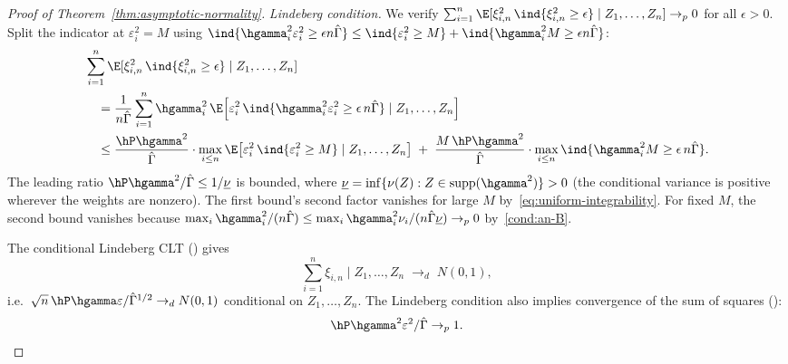 \documentclass{article}
\begin{document}
\begin{proof}[Proof of Theorem~\ref{thm:asymptotic-normality}]
\textit{Lindeberg condition.}
We verify
$\sum_{i=1}^n
  \E[\xi_{i,n}^2\,\ind{\xi_{i,n}^2 \ge \epsilon}
    \mid Z_1, \ldots, Z_n] \to_p 0$
for all $\epsilon > 0$.
Split the indicator at
$\varepsilon_i^2 = M$
using $\ind{\hgamma_i^2\varepsilon_i^2
  \ge \epsilon n\hat\Gamma}
  \le \ind{\varepsilon_i^2 \ge M}
  + \ind{\hgamma_i^2 M \ge \epsilon n\hat\Gamma}$:
\begin{align*}
&\sum_{i=1}^n
  \E[\xi_{i,n}^2\,\ind{\xi_{i,n}^2 \ge \epsilon}
    \mid Z_1, \ldots, Z_n] \\
&\quad= \frac{1}{n\hat\Gamma}\sum_{i=1}^n
  \hgamma_i^2\,
  \E\qty[\varepsilon_i^2\,
    \ind{\hgamma_i^2\varepsilon_i^2
      \ge \epsilon\, n\hat\Gamma}
    \mid Z_1, \ldots, Z_n] \\
&\quad\le \frac{\hP\hgamma^2}{\hat\Gamma}
  \cdot \max_{i \le n}
  \E\qty[\varepsilon_i^2\,
    \ind{\varepsilon_i^2 \ge M}
    \mid Z_1, \ldots, Z_n]
  \;+\;
  \frac{M\,\hP\hgamma^2}{\hat\Gamma}
  \cdot \max_{i \le n}
  \ind{\hgamma_i^2 M \ge \epsilon\, n\hat\Gamma}.
\end{align*}
The leading ratio
$\hP\hgamma^2 / \hat\Gamma \le 1/\underline\nu$
is bounded,
where $\underline\nu = \inf\{\nu(Z) : Z \in \mathrm{supp}(\hgamma^2)\} > 0$
(the conditional variance is positive
wherever the weights are nonzero).
The first bound's second factor
vanishes for large $M$
by~\eqref{eq:uniform-integrability}.
For fixed $M$,
the second bound vanishes
because
$\max_i \hgamma_i^2 / (n\hat\Gamma)
\le \max_i \hgamma_i^2\nu_i
  / (n\hat\Gamma\underline\nu) \to_p 0$
by~\ref{cond:an-B}.

The conditional Lindeberg CLT
()
gives
\begin{equation}\label{eq:conditional-clt}
\sum_{i=1}^n \xi_{i,n}
\;\Big|\; Z_1, \ldots, Z_n
\;\to_d\; N(0,1),
\end{equation}
i.e.\
$\sqrt{n}\,\hP\hgamma\varepsilon
/ \hat\Gamma^{1/2}
\to_d N(0,1)$
conditional on $Z_1, \ldots, Z_n$.
The Lindeberg condition
also implies convergence
of the sum of squares
():
\begin{equation}\label{eq:sum-of-squares}
\hP\hgamma^2\varepsilon^2 / \hat\Gamma
\to_p 1.
\end{equation}


\end{proof}
\end{document}
